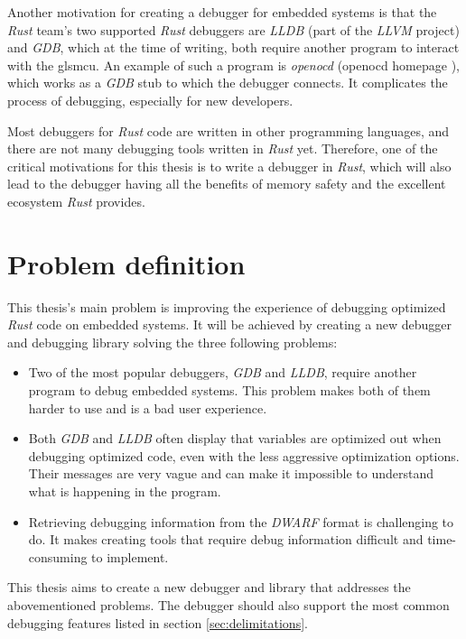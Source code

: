 Another motivation for creating a debugger for embedded systems is that the \emph{Rust} team's two supported \emph{Rust} debuggers are \emph{LLDB} (part of the \emph{LLVM} project) and \emph{GDB}, which at the time of writing, both require another program to interact with the gls{mcu}.
An example of such a program is \emph{openocd} (openocd homepage \cite{openocd}), which works as a \emph{GDB} stub to which the debugger connects.
It complicates the process of debugging, especially for new developers.


Most debuggers for \emph{Rust} code are written in other programming languages, and there are not many debugging tools written in \emph{Rust} yet.
Therefore, one of the critical motivations for this thesis is to write a debugger in \emph{Rust}, which will also lead to the debugger having all the benefits of memory safety and the excellent ecosystem \emph{Rust} provides.


\section{Problem definition} \label{sec:problemDef}
This thesis's main problem is improving the experience of debugging optimized \emph{Rust} code on embedded systems.
It will be achieved by creating a new debugger and debugging library solving the three following problems:

\begin{itemize}
  \item Two of the most popular debuggers, \emph{GDB} and \emph{LLDB}, require another program to debug embedded systems.
This problem makes both of them harder to use and is a bad user experience.

\item Both \emph{GDB} and \emph{LLDB} often display that variables are optimized out when debugging optimized code, even with the less aggressive optimization options.
Their messages are very vague and can make it impossible to understand what is happening in the program.

\item Retrieving debugging information from the \emph{DWARF} format is challenging to do.
It makes creating tools that require debug information difficult and time-consuming to implement.
\end{itemize}

This thesis aims to create a new debugger and library that addresses the abovementioned problems.
The debugger should also support the most common debugging features listed in section \ref{sec:delimitations}.



